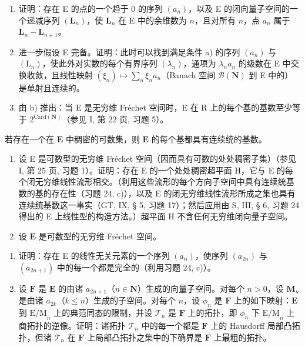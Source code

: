 \begin{enumerate}
\def\labelenumi{\alph{enumi})}
\item
  证明：存在 E 的点的一个趋于 0 的序列 \((a_{n})\)，以及 E 的闭向量子空间的一个递减序列 \((\mathbf{L}_n)\)，使 \(\mathbf{L}_n\) 在 E 中的余维数为 \(n\)，且对所有 \(n\)，点 \(a_{n}\) 属于 \(\mathbf{L}_n - \mathbf{L}_{n + 1}\)。
\item
  进一步假设 E 完备。证明：此时可以找到满足条件 a) 的序列 \((a_{n})\) 与 \((\mathrm{L}_{n})\)，使此外对实数的每个有界序列 \((\lambda_{n})\)，通项为 \(\lambda_{n}a_{n}\) 的级数在 E 中交换收敛，且线性映射 \((\xi_{n})\mapsto\sum_{n}\xi_{n}a_{n}\)（Banach 空间 \(\mathcal{B}(\mathbf{N})\) 到 E 中的）是单射且连续的。
\item
  由 b) 推出：当 E 是无穷维 Fréchet 空间时，E 在 R 上的每个基的基数至少等于 \(2^{\mathrm{Card}(\mathbf{N})}\)（参见 I, 第 22 页, 习题 5）。
\end{enumerate}

若存在一个在 \(\mathbf{E}\) 中稠密的可数集，则 \(\mathbf{E}\) 的每个基都具有连续统的基数。

\begin{enumerate}
\def\labelenumi{\arabic{enumi})}
\setcounter{enumi}{24}
\item
  设 E 是可数型的无穷维 Fréchet 空间（因而具有可数的处处稠密子集）（参见 I, 第 25 页, 习题 1）。证明：存在 E 的一个处处稠密超平面 H，它与 E 的每个闭无穷维线性流形相交。（利用这些流形的每个方向子空间中具有连续统基数的基的存在性（习题 24, c)），以及 E 的闭无穷维线性流形所成之集也具有连续统基数这一事实（GT, IX, § 5, 习题 17）；然后应用由 S, III, § 6, 习题 24 得出的 E 上线性型的构造方法。）超平面 H 不含任何无穷维闭向量子空间。
\item
  设 \(\mathbf{E}\) 是可数型的无穷维 Fréchet 空间。
\end{enumerate}

\begin{enumerate}
\def\labelenumi{\alph{enumi})}
\item
  证明：存在 E 的线性无关元素的一个序列 \((a_{n})\)，使序列 \((a_{2n})\) 与 \((a_{2n + 1})\) 中的每一个都是完全的（利用习题 24, c)）。
\item
  设 \(\mathbf{F}\) 是 \(\mathbf{E}\) 的由诸 \(a_{2n + 1}\)（\(n \in \mathbf{N}\)）生成的向量子空间。对每个 \(n > 0\)，设 \(\mathbf{M}_n\) 是由诸 \(a_{2k}\)（\(k \leqslant n\)）生成的子空间。对每个 \(n\)，设 \(\phi_n\) 是 \(\mathbf{F}\) 上的如下映射：\(\mathbf{E}\) 到 \(\mathrm{E / M}_n\) 上的典范同态的限制，并设 \(\mathcal{T}_n\) 是 \(\mathbf{F}\) 上的拓扑，即 \(\phi_n\) 下 \(\mathrm{E / M}_n\) 上商拓扑的逆像。证明：诸拓扑 \(\mathcal{T}_n\) 中的每一个都是 \(\mathbf{F}\) 上的 Hausdorff 局部凸拓扑，但诸 \(\mathcal{T}_n\) 在 \(\mathbf{F}\) 上局部凸拓扑之集中的下确界是 \(\mathbf{F}\) 上最粗的拓扑。
\end{enumerate}

